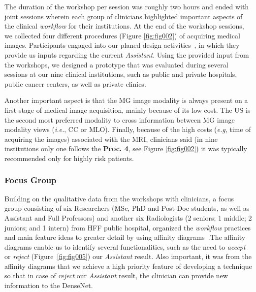 
The duration of the workshop per session was roughly two hours and ended with joint sessions wherein each group of clinicians highlighted important aspects of the clinical {\it workflow} for their institutions.
At the end of the workshop sessions, we collected four different procedures (Figure \ref{fig:fig002}) of acquiring medical images.
Participants engaged into our planed design activities~\cite{https://doi.org/10.13140/rg.2.2.16566.14403/1}, in which they provide us inputs regarding the current {\it Assistant}.
Using the provided input from the workshops, we designed a prototype that was evaluated during several sessions at our nine clinical institutions, such as public and private hospitals, public cancer centers, as well as private clinics.

Another important aspect is that the MG image modality is always present on a first stage of medical image acquisition, mainly because of its low cost.
The US is the  second most preferred modality to cross information between MG image modality views ({\it i.e.}, CC or MLO).
Finally, because of the high costs ({\it e.g}, time of acquiring the images) associated with the MRI, clinicians said (in nine institutions only one follows the {\bf Proc. 4}, see Figure \ref{fig:fig002}) it was typically recommended only for highly risk patients.

\subsubsection{Focus Group}
\label{sec:focus}

Building on the qualitative data from the workshops with clinicians, a focus group consisting of six Researchers (MSc, PhD and Post-Doc students, as well as Assistant and Full Professors) and another six Radiologists (2 seniors; 1 middle; 2 juniors; and 1 intern) from HFF public hospital, organized the {\it workflow} practices and main feature ideas to greater detail by using affinity diagrams~\cite{Harboe:2012:CSC:2145204.2145379, Hoiseth:2013:RGD:2468356.2468436}.\footnotemark[15]
The affinity diagrams enable us to identify several functionalities, such as the need to {\it accept} or {\it reject} (Figure~\ref{fig:fig005}) our {\it Assistant} result.
Also important, it was from the affinity diagrams that we achieve a high priority feature of developing a technique so that in case of {\it reject} our {\it Assistant} result, the clinician can provide new information to the DenseNet.

